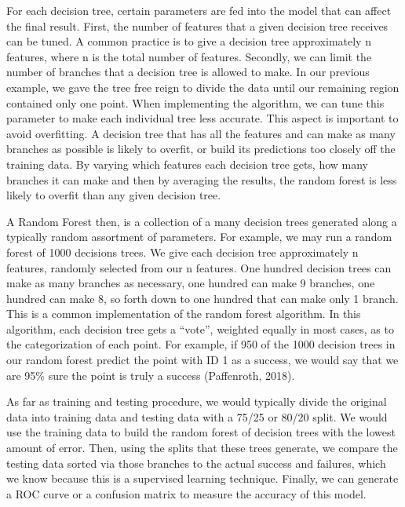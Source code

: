 \tab For each decision tree, certain parameters are fed into the model that can affect the final result. First, the number of features that a given decision tree receives can be tuned. A common practice is to give a decision tree approximately n features, where n is the total number of features. Secondly, we can limit the number of branches that a decision tree is allowed to make. In our previous example, we gave the tree free reign to divide the data until our remaining region contained only one point. When implementing the algorithm, we can tune this parameter to make each individual tree less accurate. This aspect is important to avoid overfitting. A decision tree that has all the features and can make as many branches as possible is likely to overfit, or build its predictions too closely off the training data. By varying which features each decision tree gets, how many branches it can make and then by averaging the results, the random forest is less likely to overfit than any given decision tree.  
\newline 

\tab A Random Forest then, is a collection of a many decision trees generated along a typically random assortment of parameters. For example, we may run a random forest of 1000 decisions trees. We give each decision tree approximately n features, randomly selected from our n features. One hundred decision trees can make as many branches as necessary, one hundred can make 9 branches, one hundred can make 8, so forth down to one hundred that can make only 1 branch. This is a common implementation of the random forest algorithm. In this algorithm, each decision tree gets a “vote”, weighted equally in most cases, as to the categorization of each point. For example, if 950 of the 1000 decision trees in our random forest predict the point with ID 1 as a success, we would say that we are 95\% sure the point is truly a success (Paffenroth, 2018). \newline

\tab As far as training and testing procedure, we would typically divide the original data into training data and testing data with a 75/25 or 80/20 split. We would use the training data to build the random forest of decision trees with the lowest amount of error. Then, using the splits that these trees generate, we compare the testing data sorted via those branches to the actual success and failures, which we know because this is a supervised learning technique. Finally, we can generate a ROC curve or a confusion matrix to measure the accuracy of this model.

